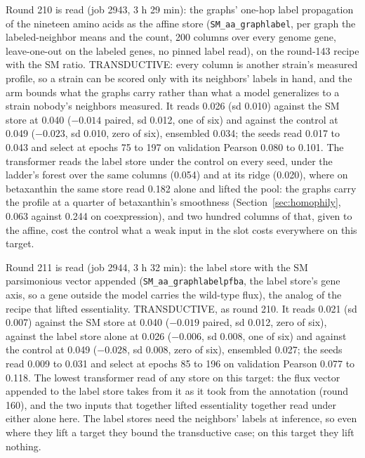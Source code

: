 Round 210 is read (job 2943, 3 h 29 min): the graphs' one-hop label propagation of the
nineteen amino acids as the affine store (\texttt{SM\_aa\_graphlabel}, per graph the
labeled-neighbor means and the count, 200 columns over every genome gene, leave-one-out
on the labeled genes, no pinned label read), on the round-143 recipe with the SM ratio.
TRANSDUCTIVE: every column is another strain's measured profile, so a strain can be
scored only with its neighbors' labels in hand, and the arm bounds what the graphs
carry rather than what a model generalizes to a strain nobody's neighbors measured. It
reads 0.026 (sd 0.010) against the SM store at 0.040 ($-0.014$ paired, sd 0.012, one
of six) and against the control at 0.049 ($-0.023$, sd 0.010, zero of six), ensembled
0.034; the seeds read 0.017 to 0.043 and select at epochs 75 to 197 on validation
Pearson 0.080 to 0.101. The transformer reads the label store under the control on
every seed, under the ladder's forest over the same columns (0.054) and at its ridge
(0.020), where on betaxanthin the same store read 0.182 alone and lifted the pool: the
graphs carry the profile at a quarter of betaxanthin's smoothness
(Section~\ref{sec:homophily}, 0.063 against 0.244 on coexpression), and two hundred
columns of that, given to the affine, cost the control what a weak input in the slot
costs everywhere on this target.

Round 211 is read (job 2944, 3 h 32 min): the label store with the SM parsimonious
vector appended (\texttt{SM\_aa\_graphlabelpfba}, the label store's gene axis, so a
gene outside the model carries the wild-type flux), the analog of the recipe that
lifted essentiality. TRANSDUCTIVE, as round 210. It reads 0.021 (sd 0.007) against the
SM store at 0.040 ($-0.019$ paired, sd 0.012, zero of six), against the label store
alone at 0.026 ($-0.006$, sd 0.008, one of six) and against the control at 0.049
($-0.028$, sd 0.008, zero of six), ensembled 0.027; the seeds read 0.009 to 0.031 and
select at epochs 85 to 196 on validation Pearson 0.077 to 0.118. The lowest transformer
read of any store on this target: the flux vector appended to the label store takes
from it as it took from the annotation (round 160), and the two inputs that together
lifted essentiality together read under either alone here. The label stores need the
neighbors' labels at inference, so even where they lift a target they bound the
transductive case; on this target they lift nothing.

